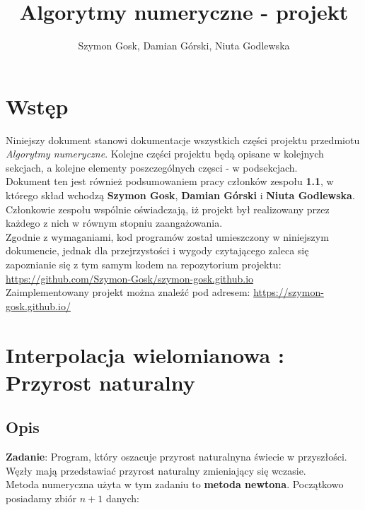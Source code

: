\documentclass[a4paper,12pt]{article}
\title{Algorytmy numeryczne - projekt}
\author{Szymon Gosk, Damian Górski, Niuta Godlewska}
\newcommand{\id}{\noindent}
\begin{document}
\maketitle

\newpage

\tableofcontents

\newpage

\section{Wstęp}

Niniejszy dokument stanowi dokumentacje wszystkich części projektu przedmiotu \textit{Algorytmy numeryczne}. Kolejne części projektu będą opisane w kolejnych sekcjach, a kolejne elementy poszczególnych częsci - w podsekcjach. \\

\id
Dokument ten jest również podsumowaniem pracy członków zespołu \textbf{1.1}, w którego skład wchodzą \textbf{Szymon Gosk}, \textbf{Damian Górski} i \textbf{Niuta Godlewska}. Członkowie zespołu wspólnie oświadczają, iż projekt był realizowany przez każdego z nich w równym stopniu zaangażowania. \\

\id
Zgodnie z wymaganiami, kod programów został umieszczony w niniejszym dokumencie, jednak dla przejrzystości i wygody czytającego zaleca się zapoznianie się z tym samym kodem na repozytorium projektu: \textcolor{blue}{\href{https://github.com/Szymon-Gosk/szymon-gosk.github.io}{https://github.com/Szymon-Gosk/szymon-gosk.github.io}} \\

\id
Zaimplementowany projekt można znaleźć pod adresem: \textcolor{blue}{\href{https://szymon-gosk.github.io/}{https://szymon-gosk.github.io/}}

\section{Interpolacja wielomianowa : Przyrost naturalny}

\subsection{Opis}

\textbf{Zadanie}: Program, który oszacuje przyrost naturalnyna świecie w przyszłości. Węzły mają przedstawiać przyrost naturalny zmieniający się wczasie. \\

\id
Metoda numeryczna użyta w tym zadaniu to \textbf{metoda newtona}. Początkowo posiadamy zbiór $n+1$ danych: \\
\end{document}

